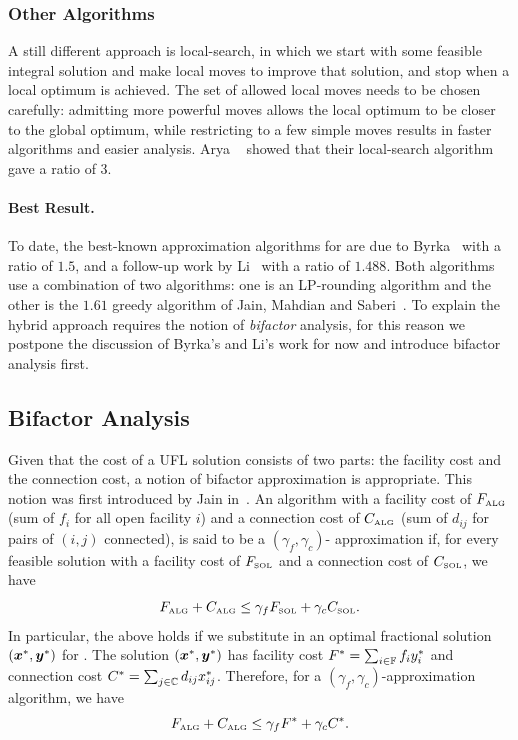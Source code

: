 \documentclass[oneside,final]{ucr}
\begin{document}
\subsubsection{Other Algorithms}
A still different approach is local-search, in which we
start with some feasible integral solution and make local
moves to improve that solution, and stop when a local
optimum is achieved. The set of allowed local moves needs to
be chosen carefully: admitting more powerful moves allows
the local optimum to be closer to the global optimum, while
restricting to a few simple moves results in faster
algorithms and easier analysis. Arya
{\etal}~\cite{AryaGKMMP01} showed that their local-search
algorithm gave a ratio of $3$.

\paragraph{Best Result.} To date, the best-known
approximation algorithms for {\UFL} are due to
Byrka~\cite{Byrka07} with a ratio of $1.5$, and a follow-up
work by Li~\cite{Li11} with a ratio of $1.488$. Both
algorithms use a combination of two algorithms: one is an
LP-rounding algorithm and the other is the $1.61$ greedy
algorithm of Jain, Mahdian and Saberi~\cite{JainMS02}. To
explain the hybrid approach requires the notion of
\emph{bifactor} analysis, for this reason we postpone the
discussion of Byrka's and Li's work for now and introduce
bifactor analysis first.

\subsection{Bifactor Analysis} \label{subsec: bifactor}
Given that the cost of a UFL solution consists of two parts:
the facility cost and the connection cost, a notion of
bifactor approximation is appropriate. This notion was first
introduced by Jain {\etal} in~\cite{JainMMSV03}. An
algorithm with a facility cost of $F_{\mbox{\tiny\rm ALG}}$ (sum of
$f_i$ for all open facility $i$) and a connection cost of
$C_{\mbox{\tiny\rm ALG}}$ (sum of $d_{ij}$ for pairs of $(i,j)$
connected), is said to be a $(\gamma_f,\gamma_c)$-
approximation if, for every feasible solution {\SOL} with a
facility cost of $F_{{{\mbox{\tiny\rm SOL}}}}$ and a connection cost of
$C_{{{\mbox{\tiny\rm SOL}}}}$, we have
\begin{equation*}
  F_{\mbox{\tiny\rm ALG}} + C_{\mbox{\tiny\rm ALG}} \leq \gamma_f F_{{{\mbox{\tiny\rm SOL}}}} +
  \gamma_c C_{{{\mbox{\tiny\rm SOL}}}}.
\end{equation*}
In particular, the above holds if we substitute in an
optimal fractional solution $(\boldsymbol{x}^\ast,\boldsymbol{y}^\ast)$ for
{\SOL}. The solution $(\boldsymbol{x}^\ast,\boldsymbol{y}^\ast)$ has facility
cost $F^\ast = \sum_{i\in\mathbb{F}} f_i y_i^\ast$ and
connection cost $C^\ast = \sum_{j\in\mathbb{C}} d_{ij}
x_{ij}^\ast$. Therefore, for a
$(\gamma_f,\gamma_c)$-approximation algorithm, we have
\begin{equation*}
  F_{\mbox{\tiny\rm ALG}} + C_{\mbox{\tiny\rm ALG}} \leq \gamma_f F^\ast +
  \gamma_c C^\ast.
\end{equation*}
\end{document}
